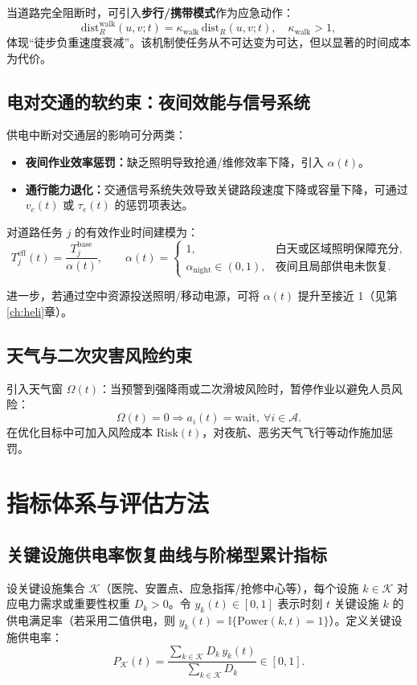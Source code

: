 \documentclass[UTF8,zihao=-4,a4paper,fontset=fandol]{ctexrep}
\begin{document}
当道路完全阻断时，可引入\textbf{步行/携带模式}作为应急动作：
\begin{equation}
  \text{dist}_R^{\text{walk}}(u,v;t)=\kappa_{\text{walk}}\,\text{dist}_R(u,v;t),\quad \kappa_{\text{walk}}>1,
\end{equation}
体现“徒步负重速度衰减”。该机制使任务从不可达变为可达，但以显著的时间成本为代价。

\section{电对交通的软约束：夜间效能与信号系统}
供电中断对交通层的影响可分两类：
\begin{itemize}[leftmargin=2em]
  \item \textbf{夜间作业效率惩罚：}缺乏照明导致抢通/维修效率下降，引入 $\alpha(t)$。
  \item \textbf{通行能力退化：}交通信号系统失效导致关键路段速度下降或容量下降，可通过 $v_e(t)$ 或 $\tau_e(t)$ 的惩罚项表达。
\end{itemize}

对道路任务 $j$ 的有效作业时间建模为：
\begin{equation}
  T^{\text{eff}}_{j}(t)=\frac{T^{\text{base}}_{j}}{\alpha(t)},\qquad
  \alpha(t)=\begin{cases}
    1, & \text{白天或区域照明保障充分},\\
    \alpha_\text{night}\in(0,1), & \text{夜间且局部供电未恢复}.
  \end{cases}
\end{equation}

进一步，若通过空中资源投送照明/移动电源，可将 $\alpha(t)$ 提升至接近 1（见第\ref{ch:heli}章）。

\section{天气与二次灾害风险约束}
引入天气窗 $\Omega(t)$：当预警到强降雨或二次滑坡风险时，暂停作业以避免人员风险：
\begin{equation}
  \Omega(t)=0\Rightarrow a_i(t)=\text{wait},\ \forall i\in\mathcal{A}.
\end{equation}
在优化目标中可加入风险成本 $\text{Risk}(t)$，对夜航、恶劣天气飞行等动作施加惩罚。

\chapter{指标体系与评估方法}\label{ch:metrics}
\section{关键设施供电率恢复曲线与阶梯型累计指标}
设关键设施集合 $\mathcal{K}$（医院、安置点、应急指挥/抢修中心等），每个设施 $k\in\mathcal{K}$ 对应电力需求或重要性权重 $D_k>0$。令 $y_k(t)\in[0,1]$ 表示时刻 $t$ 关键设施 $k$ 的供电满足率（若采用二值供电，则 $y_k(t)=\mathbb{I}\{\text{Power}(k,t)=1\}$）。定义关键设施供电率：
\begin{equation}
  P_{\mathcal{K}}(t)=\frac{\sum_{k\in\mathcal{K}} D_k\,y_k(t)}{\sum_{k\in\mathcal{K}} D_k}\in[0,1].
\end{equation}
\end{document}
